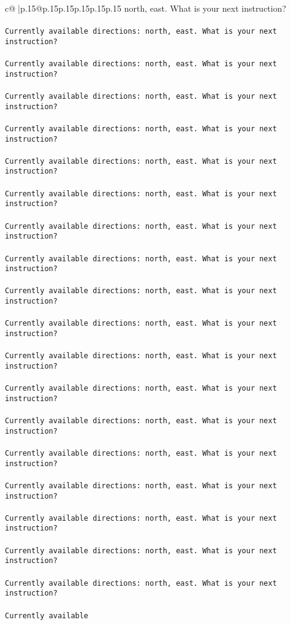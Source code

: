 \documentclass{article}
\begin{document}
{\begin{supertabular}{c@{$\;$}|p{.15\linewidth}@{}p{.15\linewidth}p{.15\linewidth}p{.15\linewidth}p{.15\linewidth}p{.15\linewidth}}
{{{north, east. What is your next instruction?\\ \tt \\ \tt Currently available directions: north, east. What is your next instruction?\\ \tt \\ \tt Currently available directions: north, east. What is your next instruction?\\ \tt \\ \tt Currently available directions: north, east. What is your next instruction?\\ \tt \\ \tt Currently available directions: north, east. What is your next instruction?\\ \tt \\ \tt Currently available directions: north, east. What is your next instruction?\\ \tt \\ \tt Currently available directions: north, east. What is your next instruction?\\ \tt \\ \tt Currently available directions: north, east. What is your next instruction?\\ \tt \\ \tt Currently available directions: north, east. What is your next instruction?\\ \tt \\ \tt Currently available directions: north, east. What is your next instruction?\\ \tt \\ \tt Currently available directions: north, east. What is your next instruction?\\ \tt \\ \tt Currently available directions: north, east. What is your next instruction?\\ \tt \\ \tt Currently available directions: north, east. What is your next instruction?\\ \tt \\ \tt Currently available directions: north, east. What is your next instruction?\\ \tt \\ \tt Currently available directions: north, east. What is your next instruction?\\ \tt \\ \tt Currently available directions: north, east. What is your next instruction?\\ \tt \\ \tt Currently available directions: north, east. What is your next instruction?\\ \tt \\ \tt Currently available directions: north, east. What is your next instruction?\\ \tt \\ \tt Currently available directions: north, east. What is your next instruction?\\ \tt \\ \tt Currently available }}}
\end{supertabular}}
\end{document}
